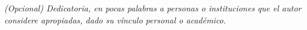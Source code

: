 \begin{flushright}

\textit{(Opcional) Dedicatoria, en pocas palabras a personas o instituciones que el autor considere apropiadas, dado su vínculo personal o académico.}

\end{flushright}

\newpage